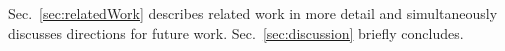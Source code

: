 Sec.~\ref{sec:relatedWork} describes related work in more detail and simultaneously discusses directions for future work. Sec.~\ref{sec:discussion} briefly concludes. 

